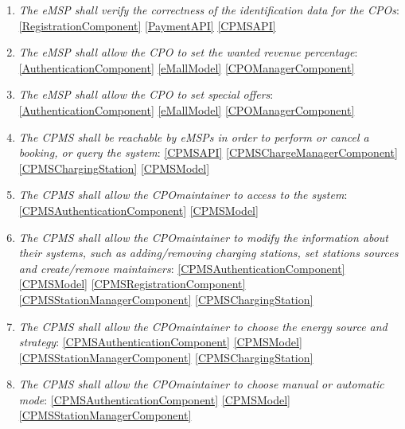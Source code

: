 \begin{enumerate}[label=\textbf{R\arabic*}]
    \item \textit{The \ac{eMSP} shall verify the correctness of the identification data for the \acp{CPO}}:
    \ref{RegistrationComponent}
    \ref{PaymentAPI}
    \ref{CPMSAPI}
    \label{req:eMSP-correct-cpo-info}
    \item \textit{The \ac{eMSP} shall allow the \ac{CPO} to set the wanted revenue percentage}:
    \ref{AuthenticationComponent}
    \ref{eMallModel}
    \ref{CPOManagerComponent}
    \label{req:eMSP-set-revenue}
    \item \textit{The \ac{eMSP} shall allow the \ac{CPO} to set special offers}:
    \ref{AuthenticationComponent}
    \ref{eMallModel}
    \ref{CPOManagerComponent}
    \label{req:eMSP-set-special-offers}
    \item \textit{The \ac{CPMS} shall be reachable by \acp{eMSP} in order to perform or cancel a booking, or query the system}:
    \ref{CPMSAPI}
    \ref{CPMSChargeManagerComponent}
    \ref{CPMSChargingStation}
    \ref{CPMSModel}
    \label{req:CPMS-reachable}
    \item \textit{The \ac{CPMS} shall allow the \ac{CPO}maintainer to access to the system}:
    \ref{CPMSAuthenticationComponent}
    \ref{CPMSModel}
    \label{req:CPMS-accessible}
    \item \textit{The \ac{CPMS} shall allow the \ac{CPO}maintainer to modify the information about their systems, such as adding/removing charging stations, set stations sources and create/remove maintainers}:
    \ref{CPMSAuthenticationComponent}
    \ref{CPMSModel}
    \ref{CPMSRegistrationComponent}
    \ref{CPMSStationManagerComponent}
    \ref{CPMSChargingStation}
    \label{req:CPMS-modify-cpo-infos}
    \item \textit{The \ac{CPMS} shall allow the \ac{CPO}maintainer to choose the energy source and strategy}:
    \ref{CPMSAuthenticationComponent}
    \ref{CPMSModel}
    \ref{CPMSStationManagerComponent}
    \ref{CPMSChargingStation}
    \label{req:CPMS-select-source-strategy}
    \item \textit{The \ac{CPMS} shall allow the \ac{CPO}maintainer to choose manual or automatic mode}:
    \ref{CPMSAuthenticationComponent}
    \ref{CPMSModel}
    \ref{CPMSStationManagerComponent}
    \label{req:CPMS-select-mode}
\end{enumerate}
\clearpage